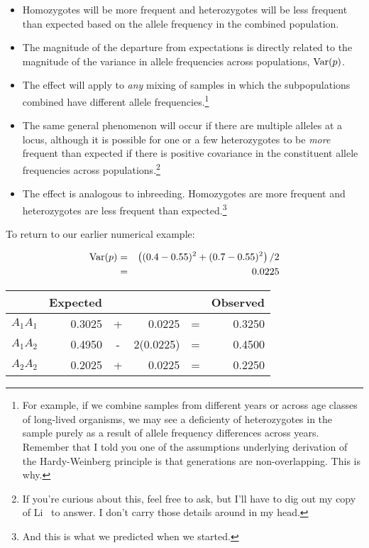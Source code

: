 \begin{itemize}

\item Homozygotes will be more frequent and heterozygotes will be less
  frequent than expected based on the allele frequency in the combined
  population.

\item The magnitude of the departure from expectations is directly
  related to the magnitude of the variance in allele frequencies
  across populations, $\hbox{Var}(p)$.

\item The effect will apply to {\it any\/} mixing of samples in which
  the subpopulations combined have different allele
  frequencies.\footnote{For example, if we combine samples from
    different years or across age classes of long-lived organisms, we
    may see a deficienty of heterozygotes in the sample purely as a
    result of allele frequency differences across years. Remember that
    I told you one of the assumptions underlying derivation of the
    Hardy-Weinberg principle is that generations are
    non-overlapping. This is why.}

\item The same general phenomenon will occur if there are multiple
  alleles at a locus, although it is possible for one or a few
  heterozygotes to be {\it more\/} frequent than expected if there is
  positive covariance in the constituent allele frequencies across
  populations.\footnote{If you're curious about this, feel free to
    ask, but I'll have to dig out my copy of Li~\cite{Li-1976} to
    answer. I don't carry those details around in my head.}

\item The effect is analogous to inbreeding. Homozygotes are more
  frequent and heterozygotes are less frequent than
  expected.\footnote{And this is what we predicted when we started.}

\end{itemize}

To return to our earlier numerical example:

\begin{eqnarray}
\hbox{Var}(p) &=& \left((0.4 - 0.55)^2 + (0.7 - 0.55)^2\right)/2 \\
              &=& 0.0225
\end{eqnarray}
\begin{center}
\begin{tabular}{l|rcrcr}
\hline\hline
         & Expected &   &           &   & Observed \\
\hline
$A_1A_1$ &   0.3025 & + &   0.0225  & = &   0.3250 \\
$A_1A_2$ &   0.4950 & - & 2(0.0225) & = &   0.4500 \\
$A_2A_2$ &   0.2025 & + &   0.0225  & = &   0.2250 \\
\hline
\end{tabular}
\end{center}

